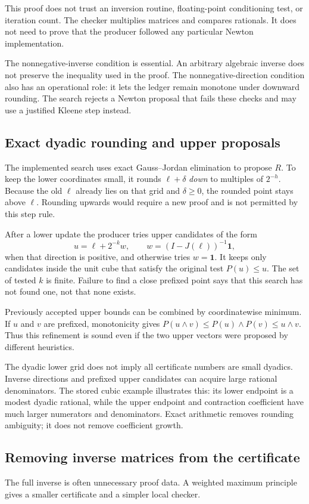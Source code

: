 \documentclass[11pt,a4paper]{article}
\theoremstyle{definition}\newtheorem{definition}[theorem]{Definition}
\theoremstyle{remark}\newtheorem{remark}[theorem]{Remark}
\newcommand{\one}{\mathbf 1}\newcommand{\zero}{\mathbf 0}
\begin{document}
This proof does not trust an inversion routine, floating-point conditioning test, or iteration count. The checker multiplies matrices and compares rationals. It does not need to prove that the producer followed any particular Newton implementation.

The nonnegative-inverse condition is essential. An arbitrary algebraic inverse does not preserve the inequality used in the proof. The nonnegative-direction condition also has an operational role: it lets the ledger remain monotone under downward rounding. The search rejects a Newton proposal that fails these checks and may use a justified Kleene step instead.

\subsection{Exact dyadic rounding and upper proposals}
The implemented search uses exact Gauss--Jordan elimination to propose $R$. To keep the lower coordinates small, it rounds $\ell+\delta$ \emph{down} to multiples of $2^{-h}$. Because the old $\ell$ already lies on that grid and $\delta\ge0$, the rounded point stays above $\ell$. Rounding upwards would require a new proof and is not permitted by this step rule.

After a lower update the producer tries upper candidates of the form
\[
 u=\ell+2^{-k}w,\qquad
 w=(I-J(\ell))^{-1}\one,
\]
when that direction is positive, and otherwise tries $w=\one$. It keeps only candidates inside the unit cube that satisfy the original test $P(u)\le u$. The set of tested $k$ is finite. Failure to find a close prefixed point says that this search has not found one, not that none exists.

Previously accepted upper bounds can be combined by coordinatewise minimum. If $u$ and $v$ are prefixed, monotonicity gives $P(u\wedge v)\le P(u)\wedge P(v)\le u\wedge v$. Thus this refinement is sound even if the two upper vectors were proposed by different heuristics.

The dyadic lower grid does not imply all certificate numbers are small dyadics. Inverse directions and prefixed upper candidates can acquire large rational denominators. The stored cubic example illustrates this: its lower endpoint is a modest dyadic rational, while the upper endpoint and contraction coefficient have much larger numerators and denominators. Exact arithmetic removes rounding ambiguity; it does not remove coefficient growth.

\subsection{Removing inverse matrices from the certificate}
The full inverse is often unnecessary proof data. A weighted maximum principle gives a smaller certificate and a simpler local checker.
\end{document}
